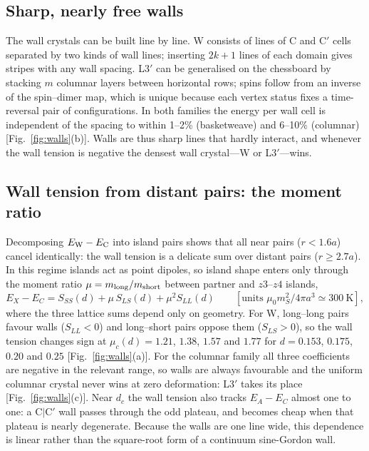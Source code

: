 \documentclass[10pt,twoside]{article}
\begin{document}
\subsection{Sharp, nearly free walls}

The wall crystals can be built line by line. W consists of lines of C and C$'$ cells separated by two kinds of wall lines; inserting $2k+1$ lines of each domain gives stripes with any wall spacing. L3$'$ can be generalised on the chessboard by stacking $m$ columnar layers between horizontal rows; spins follow from an inverse of the spin--dimer map, which is unique because each vertex status fixes a time-reversal pair of configurations. In both families the energy per wall cell is independent of the spacing to within 1--2\% (basketweave) and 6--10\% (columnar) [Fig.~\ref{fig:walls}(b)]. Walls are thus sharp lines that hardly interact, and whenever the wall tension is negative the densest wall crystal---W or L3$'$---wins.

\subsection{Wall tension from distant pairs: the moment ratio}

Decomposing $E_{\rm W}-E_{\rm C}$ into island pairs shows that all near pairs ($r<1.6a$) cancel identically: the wall tension is a delicate sum over distant pairs ($r\geq2.7a$). In this regime islands act as point dipoles, so island shape enters only through the moment ratio $\mu=m_{\rm long}/m_{\rm short}$ between partner and $z3$--$z4$ islands,
\begin{equation}
E_X-E_C=S_{SS}(d)+\mu\,S_{LS}(d)+\mu^2S_{LL}(d)\qquad\left[\text{units } \mu_0m_S^2/4\pi a^3\simeq300~\text{K}\right],
\label{eq:mu}
\end{equation}
where the three lattice sums depend only on geometry. For W, long--long pairs favour walls ($S_{LL}<0$) and long--short pairs oppose them ($S_{LS}>0$), so the wall tension changes sign at $\mu_c(d)=1.21$, $1.38$, $1.57$ and $1.77$ for $d=0.153$, $0.175$, $0.20$ and $0.25$ [Fig.~\ref{fig:walls}(a)]. For the columnar family all three coefficients are negative in the relevant range, so walls are always favourable and the uniform columnar crystal never wins at zero deformation: L3$'$ takes its place [Fig.~\ref{fig:walls}(c)]. Near $d_c$ the wall tension also tracks $E_A-E_C$ almost one to one: a C$|$C$'$ wall passes through the odd plateau, and becomes cheap when that plateau is nearly degenerate. Because the walls are one line wide, this dependence is linear rather than the square-root form of a continuum sine-Gordon wall.
\end{document}
